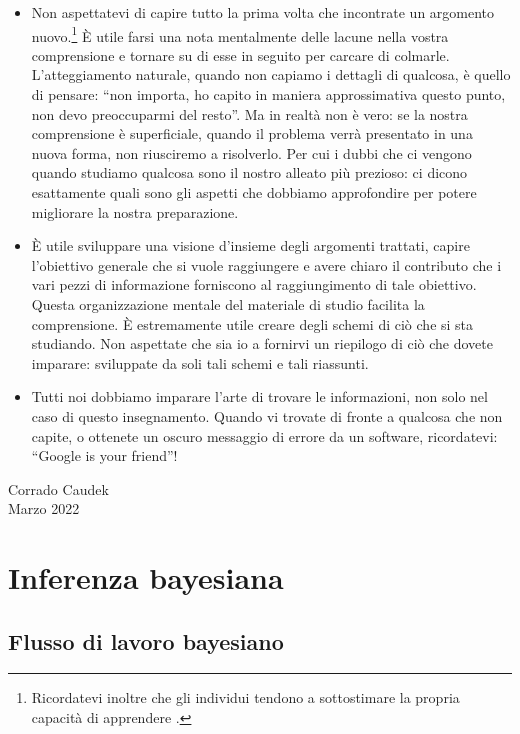 \documentclass[
  11pt,
]{krantz}
\theoremstyle{definition}
\theoremstyle{definition}
\theoremstyle{definition}
\theoremstyle{definition}
\theoremstyle{remark}
\begin{document}
\begin{itemize}
\item
  Non aspettatevi di capire tutto la prima volta che incontrate un argomento nuovo.\footnote{Ricordatevi inoltre che gli individui tendono a sottostimare la propria capacità di apprendere \citep{horn2021underestimating}.} È utile farsi una nota mentalmente delle lacune nella vostra comprensione e tornare su di esse in seguito per carcare di colmarle. L'atteggiamento naturale, quando non capiamo i dettagli di qualcosa, è quello di pensare: ``non importa, ho capito in maniera approssimativa questo punto, non devo preoccuparmi del resto''. Ma in realtà non è vero: se la nostra comprensione è superficiale, quando il problema verrà presentato in una nuova forma, non riusciremo a risolverlo. Per cui i dubbi che ci vengono quando studiamo qualcosa sono il nostro alleato più prezioso: ci dicono esattamente quali sono gli aspetti che dobbiamo approfondire per potere migliorare la nostra preparazione.
\item
  È utile sviluppare una visione d'insieme degli argomenti trattati, capire l'obiettivo generale che si vuole raggiungere e avere chiaro il contributo che i vari pezzi di informazione forniscono al raggiungimento di tale obiettivo. Questa organizzazione mentale del materiale di studio facilita la comprensione. È estremamente utile creare degli schemi di ciò che si sta studiando. Non aspettate che sia io a fornirvi un riepilogo di ciò che dovete imparare: sviluppate da soli tali schemi e tali riassunti.
\item
  Tutti noi dobbiamo imparare l'arte di trovare le informazioni, non solo nel caso di questo insegnamento. Quando vi trovate di fronte a qualcosa che non capite, o ottenete un oscuro messaggio di errore da un software, ricordatevi: ``Google is your friend''!
\end{itemize}

\begin{flushright}
Corrado Caudek\\
Marzo 2022 \end{flushright}

\mainmatter

\hypertarget{part-inferenza-bayesiana}{%
\part{Inferenza bayesiana}\label{part-inferenza-bayesiana}}

\hypertarget{ch:intro-bayes-inference}{%
\chapter{Flusso di lavoro bayesiano}\label{ch:intro-bayes-inference}}
\end{document}
